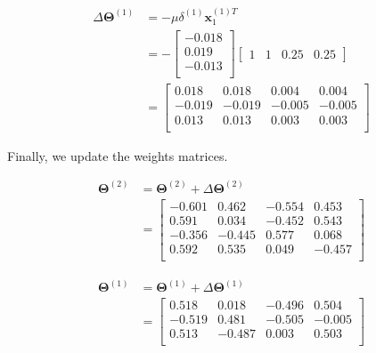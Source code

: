 \documentclass[a4paper, 10pt, twoside]{article}
\begin{document}
\begin{enumerate}[a)]
	      \begin{align*}
		      \Delta\bm{\Theta}^{(1)}
		       & = - \mu \delta^{(1)} \bm{x}_1^{(1)T} \\
		       & = -
		      \begin{bmatrix}
			      -0.018 \\
			      0.019  \\
			      -0.013 \\
		      \end{bmatrix}
		      \begin{bmatrix}
			      1 & 1 & 0.25 & 0.25
		      \end{bmatrix}              \\
		       & =
		      \begin{bmatrix}
			      0.018  & 0.018  & 0.004  & 0.004  \\
			      -0.019 & -0.019 & -0.005 & -0.005 \\
			      0.013  & 0.013  & 0.003  & 0.003  \\
		      \end{bmatrix}
	      \end{align*}

	      Finally, we update the weights matrices.

	      \begin{align*}
		      \bm{\Theta}^{(2)} & = \bm{\Theta}^{(2)} + \Delta\bm{\Theta}^{(2)} \\
		                        & =
		      \begin{bmatrix}
			      -0.601 & 0.462  & -0.554 & 0.453  \\
			      0.591  & 0.034  & -0.452 & 0.543  \\
			      -0.356 & -0.445 & 0.577  & 0.068  \\
			      0.592  & 0.535  & 0.049  & -0.457 \\
		      \end{bmatrix}
	      \end{align*}

	      \begin{align*}
		      \bm{\Theta}^{(1)} & = \bm{\Theta}^{(1)} + \Delta\bm{\Theta}^{(1)} \\
		                        & =
		      \begin{bmatrix}
			      0.518  & 0.018  & -0.496 & 0.504  \\
			      -0.519 & 0.481  & -0.505 & -0.005 \\
			      0.513  & -0.487 & 0.003  & 0.503  \\
		      \end{bmatrix}
	      \end{align*}
\end{enumerate}
\end{document}
